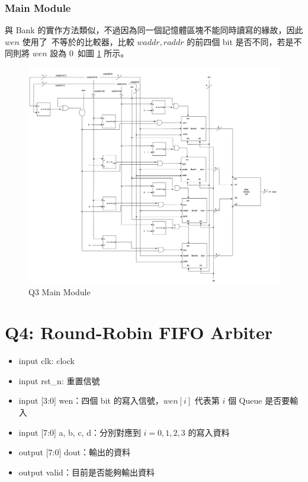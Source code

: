 \documentclass[10.5pt,compsoc,UTF8]{CjC}
\theoremstyle{mystyle}
\begin{document}
\subsubsection*{Main Module}
與 Bank 的實作方法類似，不過因為同一個記憶體區塊不能同時讀寫的緣故，因此 $wen$ 使用了\
不等於的比較器，比較 $waddr, raddr$ 的前四個 bit 是否不同，若是不同則將 $wen$ 設為 $0$\
如圖 \ref{fig:Q3-main} 所示。


\begin{figure}[!h]
  \centering
  \includegraphics[width=\textwidth]{./img/Q3.png}
  \caption{Q3 Main Module}
  \label{fig:Q3-main}
\end{figure}

\newpage


\section{Q4: Round-Robin FIFO Arbiter}
\begin{itemize}
  \item input clk: clock
  \item input rst\_n: 重置信號
  \item input [3:0] wen：四個 bit 的寫入信號，$wen[i]$ 代表第 $i$ 個 Queue 是否要輸入
  \item input [7:0] a, b, c, d：分別對應到 $i = 0, 1, 2, 3$ 的寫入資料
  \item output [7:0] dout：輸出的資料
  \item output valid：目前是否能夠輸出資料
\end{itemize}
\end{document}
